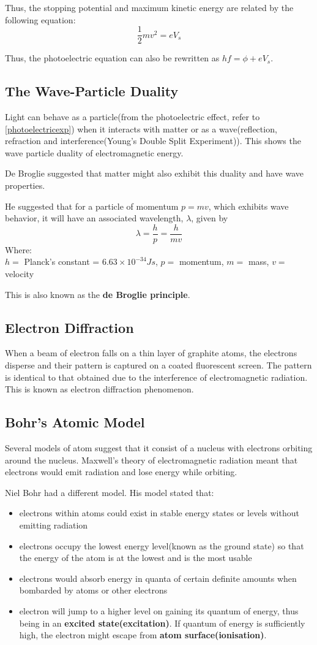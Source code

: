Thus, the stopping potential and maximum kinetic energy are related by the following equation:
$$\frac{1}{2}mv^2=eV_s$$

Thus, the photoelectric equation can also be rewritten as $hf=\phi + eV_s$.
\subsection{The Wave-Particle Duality}
Light can behave as a particle(from the photoelectric effect, refer to \ref{photoelectricexp}) when it interacts with matter or as a wave(reflection, refraction and interference(Young's Double Split Experiment)). This shows the wave particle duality of electromagnetic energy.

De Broglie suggested that matter might also exhibit this duality and have wave properties.

He suggested that for a particle of momentum $p=mv$, which exhibits wave behavior, it will have an associated wavelength, $\lambda$, given by 
$$\lambda = \frac{h}{p} = \frac{h}{mv}$$
Where:\\
$h =$ Planck's constant = $6.63\times10^{-34}Js$, 
$p = $ momentum, 
$m =$ mass, 
$v =$ velocity

This is also known as the \textbf{de Broglie principle}.

\subsection{Electron Diffraction}
When a beam of electron falls on a thin layer of graphite atoms, the electrons disperse and their pattern is captured on a coated fluorescent screen. The pattern is identical to that obtained due to the interference of electromagnetic radiation. This is known as electron diffraction phenomenon.

\subsection{Bohr's Atomic Model}
Several models of atom suggest that it consist of a nucleus with electrons orbiting around the nucleus. Maxwell's theory of electromagnetic radiation meant that electrons would emit radiation and lose energy while orbiting.

Niel Bohr had a different model. His model stated that:
\begin{itemize}
\item electrons within atoms could exist in stable energy states or levels without emitting radiation
\item electrons occupy the lowest energy level(known as the ground state) so that the energy of the atom is at the lowest and is the most usable
\item electrons would absorb energy in quanta of certain definite amounts when bombarded by atoms or other electrons
\item electron will jump to a higher level on gaining its quantum of energy, thus being in an\textbf{ excited state(excitation)}. If quantum of energy is sufficiently high, the electron might escape from \textbf{atom surface(ionisation)}.
\end{itemize}
